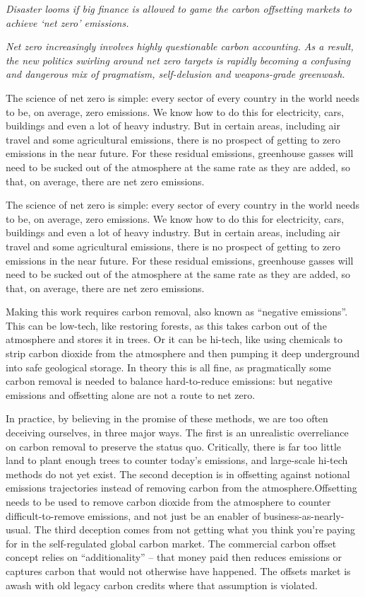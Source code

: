 \documentclass[
]{book}
\begin{document}
\emph{Disaster looms if big finance is allowed to game the carbon offsetting markets to achieve `net zero' emissions.}

\emph{Net zero increasingly involves highly questionable carbon accounting. As a result, the new politics swirling around net zero targets is rapidly becoming a confusing and dangerous mix of pragmatism, self-delusion and weapons-grade greenwash.}

The science of net zero is simple: every sector of every country in the world needs to be, on average, zero emissions. We know how to do this for electricity, cars, buildings and even a lot of heavy industry. But in certain areas, including air travel and some agricultural emissions, there is no prospect of getting to zero emissions in the near future. For these residual emissions, greenhouse gasses will need to be sucked out of the atmosphere at the same rate as they are added, so that, on average, there are net zero emissions.

The science of net zero is simple: every sector of every country in the world needs to be, on average, zero emissions. We know how to do this for electricity, cars, buildings and even a lot of heavy industry. But in certain areas, including air travel and some agricultural emissions, there is no prospect of getting to zero emissions in the near future. For these residual emissions, greenhouse gasses will need to be sucked out of the atmosphere at the same rate as they are added, so that, on average, there are net zero emissions.

Making this work requires carbon removal, also known as ``negative emissions''. This can be low-tech, like restoring forests, as this takes carbon out of the atmosphere and stores it in trees. Or it can be hi-tech, like using chemicals to strip carbon dioxide from the atmosphere and then pumping it deep underground into safe geological storage. In theory this is all fine, as pragmatically some carbon removal is needed to balance hard-to-reduce emissions: but negative emissions and offsetting alone are not a route to net zero.

In practice, by believing in the promise of these methods, we are too often deceiving ourselves, in three major ways. The first is an unrealistic overreliance on carbon removal to preserve the status quo.
Critically, there is far too little land to plant enough trees to counter today's emissions, and large-scale hi-tech methods do not yet exist.
The second deception is in offsetting against notional emissions trajectories instead of removing carbon from the atmosphere.Offsetting needs to be used to remove carbon dioxide from the atmosphere to counter difficult-to-remove emissions, and not just be an enabler of business-as-nearly-usual.
The third deception comes from not getting what you think you're paying for in the self-regulated global carbon market. The commercial carbon offset concept relies on ``additionality'' -- that money paid then reduces emissions or captures carbon that would not otherwise have happened.
The offsets market is awash with old legacy carbon credits where that assumption is violated.
\end{document}

